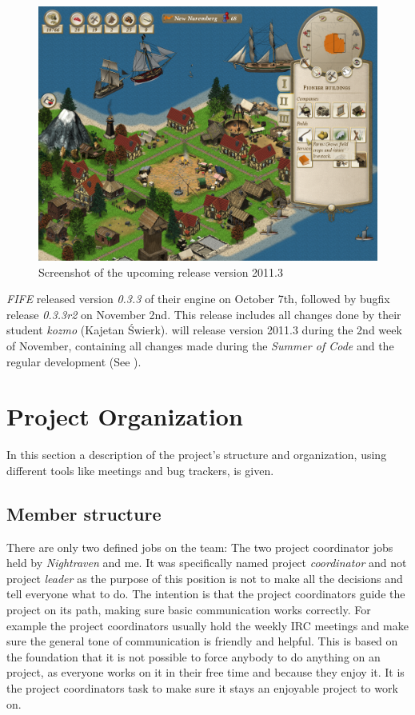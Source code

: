 \begin{figure}[!htb]
	\begin{center}
		\includegraphics[scale=0.28]{pics/uhscreenshot}
	\end{center}
    \caption{Screenshot of the upcoming \UH{} release version 2011.3}
    \label{uhscreenshot}
\end{figure}

\textit{FIFE} released version \textit{0.3.3} of their engine on October 7th,
followed by bugfix release \textit{0.3.3r2} on November 2nd. This release includes all changes done by their student
\textit{kozmo} (Kajetan Świerk). \UH{} will release \UH{} version 2011.3 during the 2nd week of November, containing all
changes made during the \textit{Summer of Code} and the regular development (See ).


\section{Project Organization}
In this section a description of the project's structure and organization, using
different tools like meetings and bug trackers, is given.

\subsection{Member structure}
There are only two defined jobs on the team: The two project coordinator jobs held by \textit{Nightraven} and me. It was
specifically named project \textit{coordinator} and not project \textit{leader} as the purpose of this position is not to
make all the decisions and tell everyone what to do. The intention is that the project coordinators guide the project on
its path, making sure basic communication works correctly. For example the project coordinators usually hold the weekly
IRC meetings and make sure the general tone of communication is friendly and helpful. This is based on the foundation
that it is not possible to force anybody to do anything on an \OS{} project, as everyone works on it in their free time
and because they enjoy it. It is the project coordinators task to make sure it stays an enjoyable project to work on.

